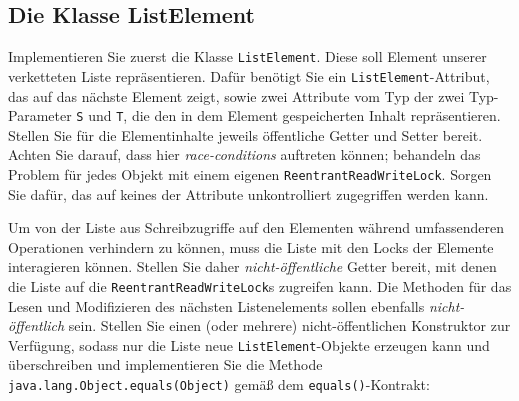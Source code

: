 \documentclass[11pt]{article} %
\begin{document}
\subsection{Die Klasse ListElement}
Implementieren Sie zuerst die Klasse \texttt{ListElement}. Diese soll Element unserer verketteten Liste repräsentieren. Dafür benötigt Sie ein \texttt{ListElement}-Attribut, das auf das nächste Element zeigt, sowie zwei Attribute vom Typ der zwei Typ-Parameter \texttt{S} und \texttt{T}, die den in dem Element gespeicherten Inhalt repräsentieren. Stellen Sie für die Elementinhalte jeweils öffentliche Getter und Setter bereit. Achten Sie darauf, dass hier \emph{race-conditions} auftreten können; behandeln das Problem für jedes Objekt mit einem eigenen \texttt{ReentrantReadWriteLock}. Sorgen Sie dafür, das auf keines der Attribute unkontrolliert zugegriffen werden kann.\par
Um von der Liste aus Schreibzugriffe auf den Elementen während umfassenderen Operationen verhindern zu können, muss die Liste mit den Locks der Elemente interagieren können. Stellen Sie daher \emph{nicht-öffentliche} Getter bereit, mit denen die Liste auf die \texttt{ReentrantReadWriteLock}s zugreifen kann. Die Methoden für das Lesen und Modifizieren des nächsten Listenelements sollen ebenfalls \emph{nicht-öffentlich} sein.\newline
Stellen Sie einen (oder mehrere) nicht-öffentlichen Konstruktor zur Verfügung, sodass nur die Liste neue \texttt{ListElement}-Objekte erzeugen kann und überschreiben und implementieren Sie die Methode \texttt{java.lang.Object.equals(Object)} gemäß dem \texttt{equals()}-Kontrakt\cite[][S. 207]{Inden2015}:
\end{document}
